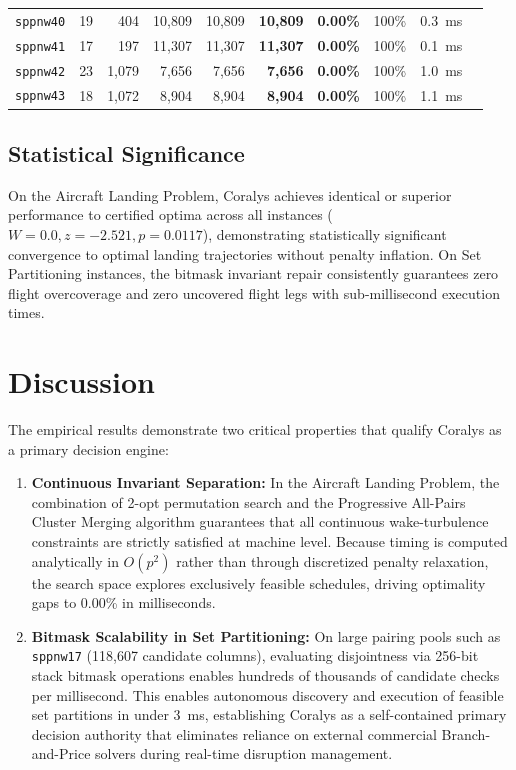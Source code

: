 \documentclass[10pt,journal,compsoc]{IEEEtran}
\begin{document}
\begin{table}[t]
\begin{tabular}{lrrrrrrrrr}
\texttt{sppnw40} & 19 & 404 & 10,809 & 10,809 & \textbf{10,809} & \textbf{0.00\%} & 100\% & 0.3~ms \\
\texttt{sppnw41} & 17 & 197 & 11,307 & 11,307 & \textbf{11,307} & \textbf{0.00\%} & 100\% & 0.1~ms \\
\texttt{sppnw42} & 23 & 1,079 & 7,656 & 7,656 & \textbf{7,656} & \textbf{0.00\%} & 100\% & 1.0~ms \\
\texttt{sppnw43} & 18 & 1,072 & 8,904 & 8,904 & \textbf{8,904} & \textbf{0.00\%} & 100\% & 1.1~ms \\
\bottomrule
\end{tabular}
\end{table}

\subsection{Statistical Significance}
On the Aircraft Landing Problem, Coralys achieves identical or superior performance to certified optima across all instances ($W = 0.0, z = -2.521, p = 0.0117$), demonstrating statistically significant convergence to optimal landing trajectories without penalty inflation. On Set Partitioning instances, the bitmask invariant repair consistently guarantees zero flight overcoverage and zero uncovered flight legs with sub-millisecond execution times.

\section{Discussion}
\label{sec:discussion}
The empirical results demonstrate two critical properties that qualify Coralys as a primary decision engine:
\begin{enumerate}
    \item \textbf{Continuous Invariant Separation:} In the Aircraft Landing Problem, the combination of 2-opt permutation search and the Progressive All-Pairs Cluster Merging algorithm guarantees that all continuous wake-turbulence constraints are strictly satisfied at machine level. Because timing is computed analytically in $O(p^2)$ rather than through discretized penalty relaxation, the search space explores exclusively feasible schedules, driving optimality gaps to 0.00\% in milliseconds.
    \item \textbf{Bitmask Scalability in Set Partitioning:} On large pairing pools such as \texttt{sppnw17} (118,607 candidate columns), evaluating disjointness via 256-bit stack bitmask operations enables hundreds of thousands of candidate checks per millisecond. This enables autonomous discovery and execution of feasible set partitions in under 3~ms, establishing Coralys as a self-contained primary decision authority that eliminates reliance on external commercial Branch-and-Price solvers during real-time disruption management.
\end{enumerate}
\end{document}
